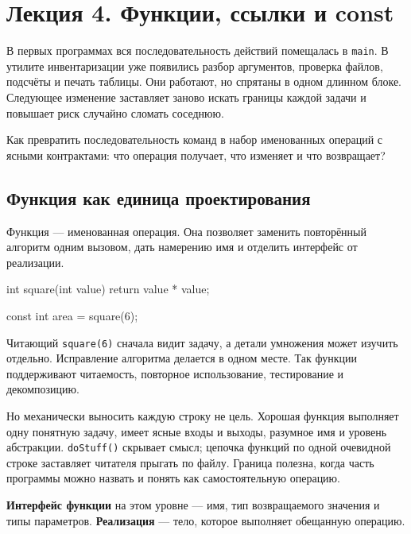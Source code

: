 
\section{Лекция 4. Функции, ссылки и const}
\label{sec:lecture-04}

В первых программах вся последовательность действий помещалась в
\texttt{main}. В утилите инвентаризации уже появились разбор аргументов,
проверка файлов, подсчёты и печать таблицы. Они работают, но спрятаны в одном
длинном блоке. Следующее изменение заставляет заново искать границы каждой
задачи и повышает риск случайно сломать соседнюю.

\begin{importantbox}
Как превратить последовательность команд в набор именованных операций с
ясными контрактами: что операция получает, что изменяет и что возвращает?
\end{importantbox}

\subsection{Функция как единица проектирования}

Функция --- именованная операция. Она позволяет заменить повторённый алгоритм
одним вызовом, дать намерению имя и отделить интерфейс от реализации.

\begin{cppcode}
int square(int value) {
    return value * value;
}

const int area = square(6);
\end{cppcode}

Читающий \texttt{square(6)} сначала видит задачу, а детали умножения может
изучить отдельно. Исправление алгоритма делается в одном месте. Так функции
поддерживают читаемость, повторное использование, тестирование и декомпозицию.

Но механически выносить каждую строку не цель. Хорошая функция выполняет одну
понятную задачу, имеет ясные входы и выходы, разумное имя и уровень абстракции.
\texttt{doStuff()} скрывает смысл; цепочка функций по одной очевидной строке
заставляет читателя прыгать по файлу. Граница полезна, когда часть программы
можно назвать и понять как самостоятельную операцию.

\begin{definition}
\textbf{Интерфейс функции} на этом уровне --- имя, тип возвращаемого значения
и типы параметров. \textbf{Реализация} --- тело, которое выполняет обещанную
операцию.
\end{definition}

